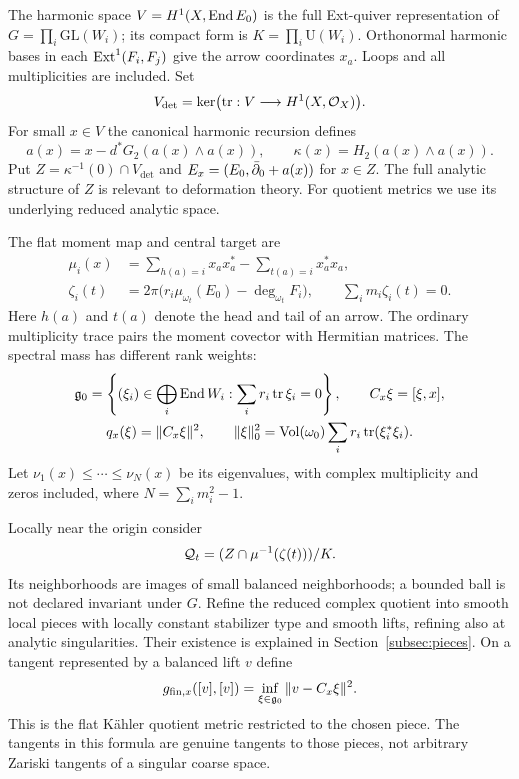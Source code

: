 The harmonic space $V=H^1(X,\operatorname{End} E_0)$ is the full Ext-quiver
representation of $G=\prod_i\mathrm{GL}(W_i)$; its compact form is
$K=\prod_i\mathrm U(W_i)$. Orthonormal harmonic bases in each
$\operatorname{Ext}^1(F_i,F_j)$ give the arrow coordinates $x_a$. Loops and all
multiplicities are included. Set
\[
 V_{\det}=\ker\bigl(\operatorname{tr}:V\longrightarrow H^1(X,\mathcal O_X)\bigr).
\]
For small $x\in V$ the canonical harmonic recursion defines
\begin{equation}\label{eq:recursion-intro}
 a(x)=x-d^*G_2(a(x)\wedge a(x)),\qquad
 \kappa(x)=H_2(a(x)\wedge a(x)).
\end{equation}
Put $Z=\kappa^{-1}(0)\cap V_{\det}$ and
$E_x=(E_0,\bar\partial_0+a(x))$ for $x\in Z$.
The full analytic structure of $Z$ is relevant to deformation theory.
For quotient metrics we use its underlying reduced analytic space.

The flat moment map and central target are
\begin{equation}\label{eq:moment}
 \begin{split}
 \mu_i(x)&=\sum_{h(a)=i}x_ax_a^*-\sum_{t(a)=i}x_a^*x_a,\\
 \zeta_i(t)&=2\pi\bigl(r_i\mu_{\omega_t}(E_0)-\deg_{\omega_t}F_i\bigr),
 \qquad \sum_i m_i\zeta_i(t)=0 .
 \end{split}
\end{equation}
Here $h(a)$ and $t(a)$ denote the head and tail of an arrow.
The ordinary multiplicity trace pairs the moment covector with
Hermitian matrices. The spectral mass has different rank weights:
\begin{equation}\label{eq:finite-spectrum}
 \begin{gathered}
 \mathfrak g_0=\left\{(\xi_i)\in\bigoplus_i\operatorname{End} W_i:
                  \sum_i r_i\operatorname{tr}\xi_i=0\right\},\qquad
 C_x\xi=[\xi,x],\\
 q_x(\xi)=\|C_x\xi\|^2,\qquad
 \|\xi\|_0^2=\operatorname{Vol}(\omega_0)\sum_i r_i\operatorname{tr}(\xi_i^*\xi_i).
 \end{gathered}
\end{equation}
Let $\nu_1(x)\le\cdots\le\nu_N(x)$ be its eigenvalues, with complex
multiplicity and zeros included, where $N=\sum_i m_i^2-1$.

Locally near the origin consider
\[
 \mathcal Q_t=(Z\cap\mu^{-1}(\zeta(t)))/K .
\]
Its neighborhoods are images of small balanced neighborhoods; a bounded
ball is not declared invariant under $G$. Refine the reduced complex
quotient into smooth local pieces with locally constant stabilizer type
and smooth lifts, refining also at analytic singularities. Their existence
is explained in Section~\ref{subsec:pieces}. On a tangent represented by a
balanced lift $v$ define
\begin{equation}\label{eq:finite-metric}
 g_{\mathrm{fin},x}([v],[v])
       =\inf_{\xi\in\mathfrak g_0}\|v-C_x\xi\|^2.
\end{equation}
This is the flat K\"ahler quotient metric restricted to the chosen piece.
The tangents in this formula are genuine tangents to those pieces, not
arbitrary Zariski tangents of a singular coarse space.

